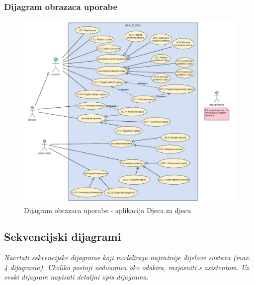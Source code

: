 				\eject
				\subsubsection{Dijagram obrazaca uporabe}
					\begin{figure}[H]
						\includegraphics[width=\textwidth,height=0.7\textheight]{dijagrami/UCD - Djeca za djecu.png}
						\centering
						\caption{Dijagram obrazaca uporabe - aplikacija Djeca za djecu}
						\label{fig:useCaseDiagramMain}
					\end{figure}
				\eject
				
			\subsection{Sekvencijski dijagrami}
				
				
				\textit{Nacrtati sekvencijske dijagrame koji modeliraju najvažnije dijelove sustava (max. 4 dijagrama). Ukoliko postoji nedoumica oko odabira, razjasniti s asistentom. Uz svaki dijagram napisati detaljni opis dijagrama.}
				\eject
	
